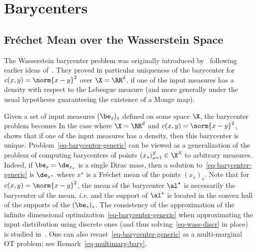 


\chapter{Barycenters}

\section{Fr\'echet Mean over the Wasserstein Space}


The Wasserstein barycenter problem was originally introduced by~\cite{Carlier_wasserstein_barycenter} following earlier ideas of~\cite{carlierekelandmatching}. They proved in particular uniqueness of the barycenter for $c(x,y)=\norm{x-y}^2$ over $\X=\RR^d$, if one of the input measures has a density with respect to the Lebesgue measure (and more generally under the usual hypotheses guaranteeing the existence of a Monge map).

Given a set of input measures $(\be_s)_s$ defined on some space $\X$, the barycenter problem becomes
	In the case where $\X=\RR^d$ and $c(x,y)=\norm{x-y}^2$,~\cite{Carlier_wasserstein_barycenter} shows that if one of the input measures has a density, then this barycenter is unique.
	Problem~\eqref{eq-barycenter-generic} can be viewed as a generalization of the problem of computing barycenters of points $(x_s)_{s=1}^S \in \X^S$ to arbitrary measures. Indeed, if $\be_s=\de_{x_s}$ is a single Dirac mass, then a solution to~\eqref{eq-barycenter-generic} is $\de_{x^\star}$ where $x^\star$ is a Fr\'echet mean of the points $(x_s)_s$.
	Note that for $c(x,y)=\norm{x-y}^2$, the mean of the barycenter $\al^\star$ is necessarily the barycenter of the mean, \emph{i.e.}
	and the support of $\al^\star$ is located in the convex hull of the supports of the $(\be_s)_s$.
	The consistency of the approximation of the infinite dimensional optimization~\eqref{eq-barycenter-generic} when approximating the input distribution using discrete ones (and thus solving~\eqref{eq-wass-discr} in place) is studied in~\cite{Carlier-NumericsBarycenters}.
	One can also recast~\eqref{eq-barycenter-generic} as a multi-marginal OT problem; see Remark~\ref{eq-multimarg-bary}.


